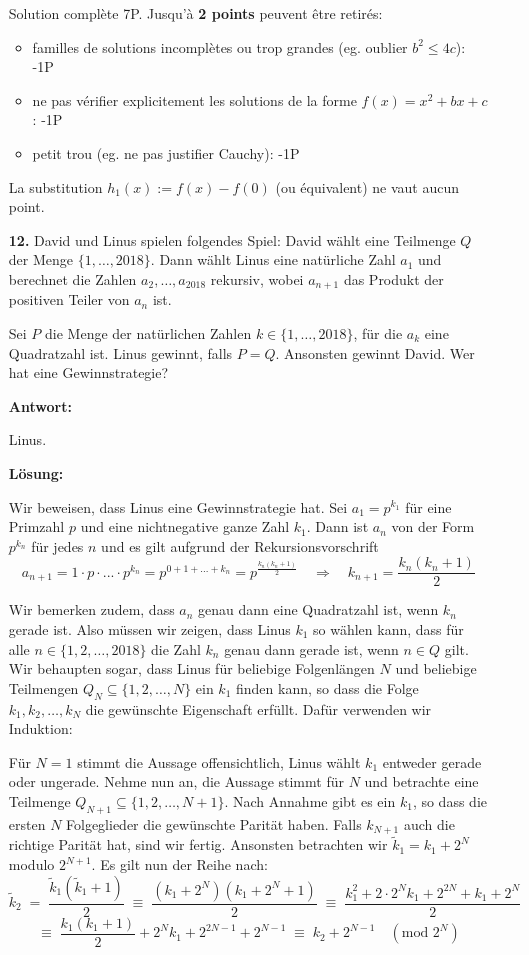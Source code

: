 \documentclass[language=german,style=solution]{smo}
\begin{document}
\begin{enumerate}
Solution complète 7P. Jusqu'à \textbf{2 points} peuvent être retirés:
\begin{itemize}
\item familles de solutions incomplètes ou trop grandes (eg. oublier $b^2\leq 4c$): -1P
\item ne pas vérifier explicitement les solutions de la forme $f(x)=x^2+bx+c$: -1P
\item petit trou (eg. ne pas justifier Cauchy): -1P
\end{itemize}

La substitution $h_1(x):=f(x)-f(0)$ (ou équivalent) ne vaut aucun point.

\newpage

\item[\textbf{12.}] %
David und Linus spielen folgendes Spiel:
David wählt eine Teilmenge $Q$ der Menge $\{1, \dots ,2018\}$. Dann wählt Linus eine natürliche Zahl $a_1$ und berechnet die Zahlen $a_2, \dots , a_{2018}$ rekursiv, wobei $a_{n+1}$ das Produkt der positiven Teiler von $a_n$ ist.

Sei $P$ die Menge der natürlichen Zahlen $k\in\{1,\dots,2018\}$, für die $a_k$ eine Quadratzahl ist. Linus gewinnt, falls $P=Q$. Ansonsten gewinnt David. Wer hat eine Gewinnstrategie?

\textbf{Antwort:}

Linus.

\textbf{Lösung:} 

Wir beweisen, dass Linus eine Gewinnstrategie hat. Sei $a_1 = p^{k_1}$ für eine Primzahl $p$ und eine nichtnegative ganze Zahl $k_1$. Dann ist $a_n$ von der Form $p^{k_n}$ für jedes $n$ und es gilt aufgrund der Rekursionsvorschrift 
\[
a_{n+1} = 1 \cdot p \cdot ... \cdot p^{k_n} = p^{0+1+...+k_n} = p^{\frac{k_n(k_n+1)}{2}} \quad \Rightarrow \quad k_{n+1} = \frac{k_n(k_n+1)}{2}
\]

Wir bemerken zudem, dass $a_n$ genau dann eine Quadratzahl ist, wenn $k_n$ gerade ist. Also müssen wir zeigen, dass Linus $k_1$ so wählen kann, dass für alle 
$n \in \{1,2, \dots , 2018\}$ die Zahl $k_n$ genau dann gerade ist, wenn $n \in Q$ gilt. Wir behaupten sogar, dass Linus für beliebige Folgenlängen $N$ und beliebige Teilmengen $Q_N \subseteq \{1,2, \dots ,N\}$ ein $k_1$ finden kann, so dass die Folge $k_1, k_2, \dots , k_N$ die gewünschte Eigenschaft erfüllt. Dafür verwenden wir Induktion:

Für $N=1$ stimmt die Aussage offensichtlich, Linus wählt $k_1$ entweder gerade oder ungerade. \newline
Nehme nun an, die Aussage stimmt für $N$ und betrachte eine Teilmenge $Q_{N+1} \subseteq \{1,2,\dots,N+1\}$. Nach Annahme gibt es ein $k_1$, so dass die ersten $N$ Folgeglieder die gewünschte Parität haben. Falls $k_{N+1}$ auch die richtige Parität hat, sind wir fertig. Ansonsten betrachten wir $\tilde k_1 = k_1 + 2^N$ modulo $2^{N+1}$. Es gilt nun der Reihe nach:
\[
\tilde k_2 \; = \; \frac{\tilde k_1(\tilde k_1 + 1)}{2} \; \equiv \; \frac{(k_1+2^N)(k_1+2^N+1)}{2} \; \equiv \; \frac{k_1^2+2\cdot2^Nk_1+2^{2N}+k_1+2^N}{2} 
\]
\[ \equiv \; \frac{k_1(k_1+1)}{2} + 2^N k_1 + 2^{2N-1} + 2^{N-1} \; \equiv \; k_2 + 2^{N-1} \quad (\text{mod } 2^N)
\]


\end{enumerate}
\end{document}
